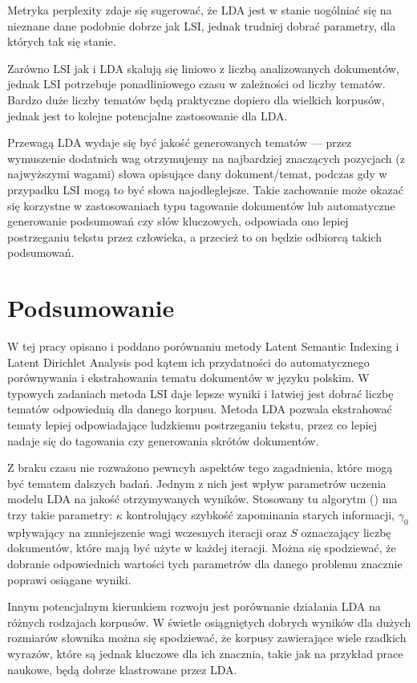 \documentclass[11pt,a4paper]{article}
\begin{document}
Metryka perplexity zdaje się sugerować, że LDA jest w stanie uogólniać się na
nieznane dane podobnie dobrze jak LSI, jednak trudniej dobrać parametry, dla
których tak się stanie.

Zarówno LSI jak i LDA skalują się liniowo z liczbą analizowanych dokumentów,
jednak LSI potrzebuje ponadliniowego czasu w zależności od liczby tematów.
Bardzo duże liczby tematów będą praktyczne dopiero dla wielkich korpusów,
jednak jest to kolejne potencjalne zastosowanie dla LDA.

Przewagą LDA wydaje się być jakość generowanych tematów --- przez wymuszenie
dodatnich wag otrzymujemy na najbardziej znaczących pozycjach (z najwyższymi
wagami) słowa opisujące dany dokument/temat, podczas gdy w przypadku LSI mogą
to być słowa najodleg\-lejsze. Takie zachowanie może okazać się korzystne w
zastosowaniach typu tagowanie dokumentów lub automatyczne generowanie
podsumowań czy słów kluczowych, odpowiada ono lepiej postrzeganiu tekstu przez
człowieka, a przecież to on będzie odbiorcą takich podsumowań.

\pagebreak

\section{Podsumowanie}

W tej pracy opisano i poddano porównaniu metody Latent Semantic Indexing i
Latent Dirichlet Analysis pod kątem ich przydatności do automatycznego
porównywania i ekstrahowania tematu dokumentów w języku polskim. W typowych
zadaniach metoda LSI daje lepsze wyniki i łatwiej jest dobrać liczbę tematów
odpowiednią dla danego korpusu. Metoda LDA pozwala ekstrahować tematy lepiej
odpowiadające ludzkiemu postrzeganiu tekstu, przez co lepiej nadaje się do
tagowania czy generowania skrótów dokumentów.

Z braku czasu nie rozważono pewncyh aspektów tego zagadnienia, które mogą być
tematem dalszych badań. Jednym z nich jest wpływ parametrów uczenia modelu LDA
na jakość otrzymywanych wyników. Stosowany tu algorytm
(\cite{gensim-algorithm}) ma trzy takie parametry: $\kappa$ kontrolujący
szybkość zapominania starych informacji, $\gamma_0$ wpływający na zmniejszenie
wagi wczesnych iteracji oraz $S$ oznaczający liczbę dokumentów, które mają być
użyte w każdej iteracji. Można się spodziewać, że dobranie odpowiednich
wartości tych parametrów dla danego problemu znacznie poprawi osiągane wyniki.

Innym potencjalnym kierunkiem rozwoju jest porównanie działania LDA na różnych
rodzajach korpusów. W świetle osiągniętych dobrych wyników dla dużych rozmiarów
słownika można się spodziewać, że korpusy zawierające wiele rzadkich wyrazów,
które są jednak kluczowe dla ich znacznia, takie jak na przykład prace naukowe,
będą dobrze klastrowane przez LDA.
\end{document}
